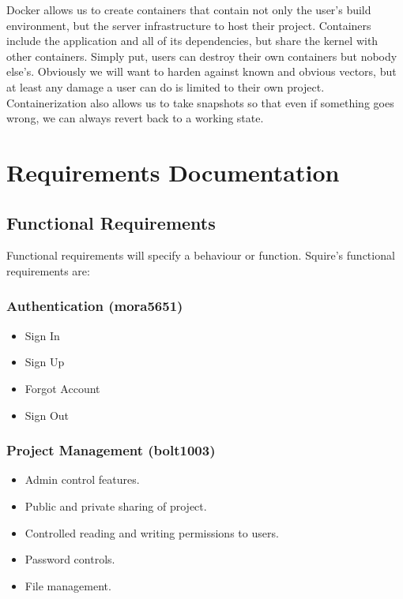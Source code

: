 \documentclass[11pt]{report}
\begin{document}
    Docker allows us to create containers that contain not only the user's build environment, but the server infrastructure to host their project. Containers include the application and all of its dependencies, but share the kernel with other containers. Simply put, users can destroy their own containers but nobody else’s. Obviously we will want to harden against known and obvious vectors, but at least any damage a user can do is limited to their own project. Containerization also allows us to take snapshots so that even if something goes wrong, we can always revert back to a working state.



\chapter{Requirements Documentation}
\section{Functional Requirements}
    Functional requirements will specify a behaviour or function. Squire's functional requirements are:
    \subsection{Authentication (mora5651)}
        \begin{itemize}
            \item Sign In
            \item Sign Up
            \item Forgot Account
            \item Sign Out
        \end{itemize}
    \subsection{Project Management (bolt1003)}
        \begin{itemize}
            \item Admin control features.  
            \item Public and private sharing of project.
            \item Controlled reading and writing permissions to users. 
            \item Password controls. 
            \item File management. 
        \end{itemize}
\end{document}
